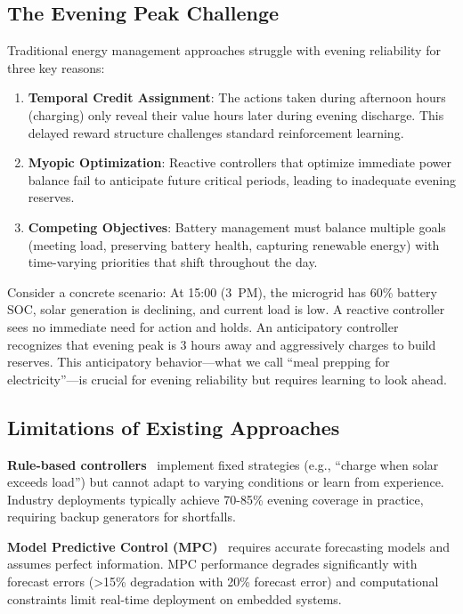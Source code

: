 \documentclass[11pt,a4paper]{article}
\begin{document}
\subsection{The Evening Peak Challenge}

Traditional energy management approaches struggle with evening reliability for three key reasons:
\begin{enumerate}
    \item \textbf{Temporal Credit Assignment}: The actions taken during afternoon hours (charging) only reveal their value hours later during evening discharge. This delayed reward structure challenges standard reinforcement learning.
    \item \textbf{Myopic Optimization}: Reactive controllers that optimize immediate power balance fail to anticipate future critical periods, leading to inadequate evening reserves.
    \item \textbf{Competing Objectives}: Battery management must balance multiple goals (meeting load, preserving battery health, capturing renewable energy) with time-varying priorities that shift throughout the day.
\end{enumerate}

Consider a concrete scenario: At 15:00 (3~PM), the microgrid has 60\% battery SOC, solar generation is declining, and current load is low. A reactive controller sees no immediate need for action and holds. An anticipatory controller recognizes that evening peak is 3 hours away and aggressively charges to build reserves. This anticipatory behavior—what we call ``meal prepping for electricity''—is crucial for evening reliability but requires learning to look ahead.

\subsection{Limitations of Existing Approaches}

\textbf{Rule-based controllers}~\cite{reilly2020} implement fixed strategies (e.g., ``charge when solar exceeds load'') but cannot adapt to varying conditions or learn from experience. Industry deployments typically achieve 70-85\% evening coverage in practice, requiring backup generators for shortfalls.

\textbf{Model Predictive Control (MPC)}~\cite{kou2016,parisio2014} requires accurate forecasting models and assumes perfect information. MPC performance degrades significantly with forecast errors (>15\% degradation with 20\% forecast error) and computational constraints limit real-time deployment on embedded systems.
\end{document}
